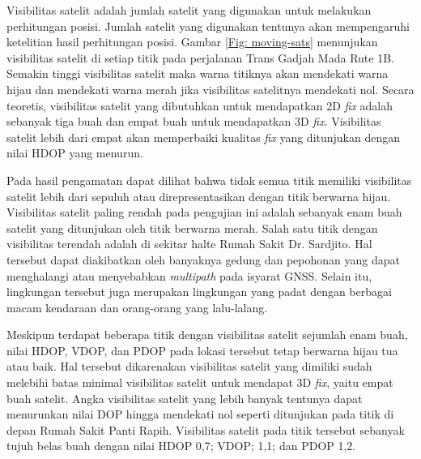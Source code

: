 Visibilitas satelit adalah jumlah satelit yang digunakan untuk melakukan perhitungan posisi. Jumlah satelit yang digunakan tentunya akan mempengaruhi ketelitian hasil perhitungan posisi. Gambar \ref{Fig: moving-sats} menunjukan visibilitas satelit di setiap titik pada perjalanan Trans Gadjah Mada Rute 1B. Semakin tinggi visibilitas satelit maka warna titiknya akan mendekati warna hijau dan mendekati warna merah jika visibilitas satelitnya mendekati nol. Secara teoretis, visibilitas satelit yang dibutuhkan untuk mendapatkan 2D \textit{fix} adalah sebanyak tiga buah dan empat buah untuk mendapatkan 3D \textit{fix}. Visibilitas satelit lebih dari empat akan memperbaiki kualitas \textit{fix} yang ditunjukan dengan nilai HDOP yang menurun. 

Pada hasil pengamatan dapat dilihat bahwa tidak semua titik memiliki visibilitas satelit lebih dari sepuluh atau direpresentasikan dengan titik berwarna hijau. Visibilitas satelit paling rendah pada pengujian ini adalah sebanyak enam buah satelit yang ditunjukan oleh titik berwarna merah. Salah satu titik dengan visibilitas terendah adalah di sekitar halte Rumah Sakit Dr. Sardjito. Hal tersebut dapat diakibatkan oleh banyaknya gedung dan pepohonan yang dapat menghalangi atau menyebabkan \textit{multipath} pada isyarat GNSS. Selain itu, lingkungan tersebut juga merupakan lingkungan yang padat dengan berbagai macam kendaraan dan orang-orang yang lalu-lalang.

Meskipun terdapat beberapa titik dengan visibilitas satelit sejumlah enam buah, nilai HDOP, VDOP, dan PDOP pada lokasi tersebut tetap berwarna hijau tua atau baik. Hal tersebut dikarenakan visibilitas satelit yang dimiliki sudah melebihi batas minimal visibilitas satelit untuk mendapat 3D \textit{fix}, yaitu empat buah satelit. Angka visibilitas satelit yang lebih banyak tentunya dapat menurunkan nilai DOP hingga mendekati nol seperti ditunjukan pada titik di depan Rumah Sakit Panti Rapih. Visibilitas satelit pada titik tersebut sebanyak tujuh belas buah dengan nilai HDOP 0,7; VDOP; 1,1; dan PDOP 1,2.